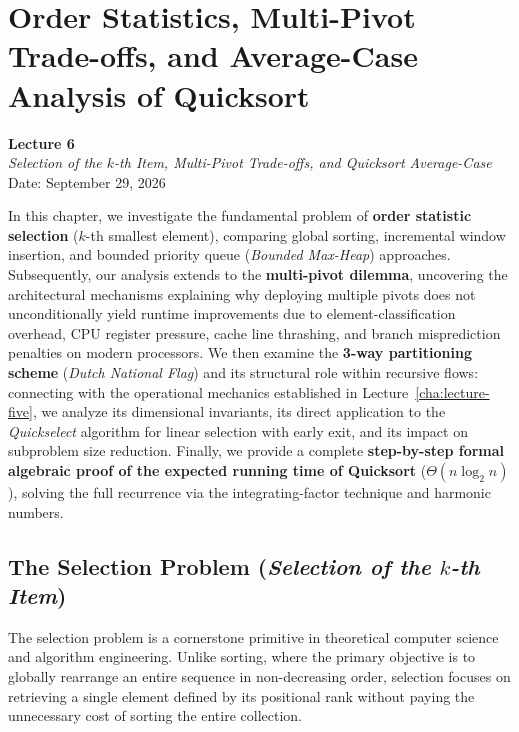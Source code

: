 \chapter{Order Statistics, Multi-Pivot Trade-offs, and Average-Case Analysis of Quicksort}
\label{cha:lecture-six}

\begin{center}
  \textbf{Lecture 6}\\
  \emph{Selection of the $k$-th Item, Multi-Pivot Trade-offs, and Quicksort Average-Case}\\[0.5em]
  Date: September 29, 2026
\end{center}

In this chapter, we investigate the fundamental problem of \textbf{order statistic selection} ($k$-th smallest element), comparing global sorting, incremental window insertion, and bounded priority queue (\textit{Bounded Max-Heap}) approaches. Subsequently, our analysis extends to the \textbf{multi-pivot dilemma}, uncovering the architectural mechanisms explaining why deploying multiple pivots does not unconditionally yield runtime improvements due to element-classification overhead, CPU register pressure, cache line thrashing, and branch misprediction penalties on modern processors. We then examine the \textbf{3-way partitioning scheme} (\textit{Dutch National Flag}) and its structural role within recursive flows: connecting with the operational mechanics established in Lecture~\ref{cha:lecture-five}, we analyze its dimensional invariants, its direct application to the \textit{Quickselect} algorithm for linear selection with early exit, and its impact on subproblem size reduction. Finally, we provide a complete \textbf{step-by-step formal algebraic proof of the expected running time of Quicksort} ($\Theta(n \log_2 n)$), solving the full recurrence via the integrating-factor technique and harmonic numbers.

\FloatBarrier
\section{The Selection Problem (\textit{Selection of the \texorpdfstring{$k$}{k}-th Item})}
\label{sec:selection-problem}

The selection problem is a cornerstone primitive in theoretical computer science and algorithm engineering. Unlike sorting, where the primary objective is to globally rearrange an entire sequence in non-decreasing order, selection focuses on retrieving a single element defined by its positional rank without paying the unnecessary cost of sorting the entire collection.

